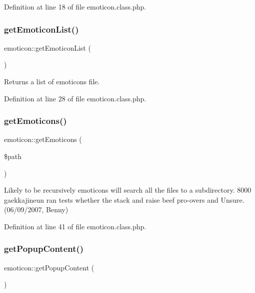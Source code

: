 Definition at line 18 of file emoticon.\+class.\+php.

\hypertarget{classemoticon_ac8b67c22af9daf48fb1d95f4fea2d07e}{}\label{classemoticon_ac8b67c22af9daf48fb1d95f4fea2d07e} 
\subsubsection{\texorpdfstring{get\+Emoticon\+List()}{getEmoticonList()}}
{\footnotesize\ttfamily emoticon\+::get\+Emoticon\+List (\begin{DoxyParamCaption}{ }\end{DoxyParamCaption})}



Returns a list of emoticons file. 



Definition at line 28 of file emoticon.\+class.\+php.

\hypertarget{classemoticon_a95bdb6fcf406fc9882332a3b5f01542c}{}\label{classemoticon_a95bdb6fcf406fc9882332a3b5f01542c} 
\subsubsection{\texorpdfstring{get\+Emoticons()}{getEmoticons()}}
{\footnotesize\ttfamily emoticon\+::get\+Emoticons (\begin{DoxyParamCaption}\item[{}]{\$path }\end{DoxyParamCaption})}



Likely to be recursively emoticons will search all the files to a subdirectory. 8000 gaekkajineun ran tests whether the stack and raise beef pro-\/overs and Unsure. (06/09/2007, Benny) 



Definition at line 41 of file emoticon.\+class.\+php.

\hypertarget{classemoticon_afe901b31a28bed049ed8d553e996736d}{}\label{classemoticon_afe901b31a28bed049ed8d553e996736d} 
\subsubsection{\texorpdfstring{get\+Popup\+Content()}{getPopupContent()}}
{\footnotesize\ttfamily emoticon\+::get\+Popup\+Content (\begin{DoxyParamCaption}{ }\end{DoxyParamCaption})}



